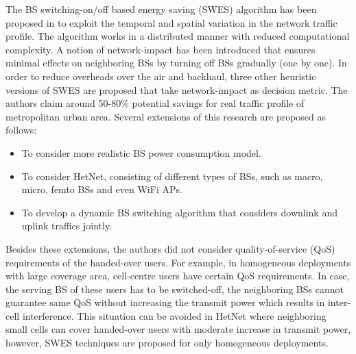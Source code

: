 \documentclass[article,10pt,twocolumn]{IEEEtran}
\begin{document}
The BS switching-on/off based energy saving (SWES) algorithm has been proposed in \citep{6489498} to exploit the temporal and spatial variation in the network traffic profile. The algorithm works in a distributed manner with reduced computational complexity. A notion of network-impact has been introduced that ensures minimal effects on neighboring BSs by turning off BSs gradually (one by one). In order to reduce overheads over the air and backhaul, three other heuristic versions of SWES are proposed that take network-impact as decision metric. The authors claim around 50-80\% potential savings for real traffic profile of metropolitan urban area. Several extensions of this research are proposed as follows:
\begin{itemize}
  \item To consider more realistic BS power consumption model.
  \item To consider HetNet, consisting of different types of BSs, such as macro, micro, femto BSs and even WiFi APs.
  \item To develop a dynamic BS switching algorithm that considers downlink and uplink traffics jointly.
\end{itemize}

Besides these extensions, the authors did not consider quality-of-service (QoS) requirements of the handed-over users. For example, in homogeneous deployments with large coverage area, cell-centre users have certain QoS requirements. In case, the serving BS of these users has to be switched-off, the neighboring BSs cannot guarantee same QoS without increasing the transmit power which results in inter-cell interference. This situation can be avoided in HetNet where neighboring small cells can cover handed-over users with moderate increase in transmit power, however, SWES techniques are proposed for only homogeneous deployments.
\end{document}

